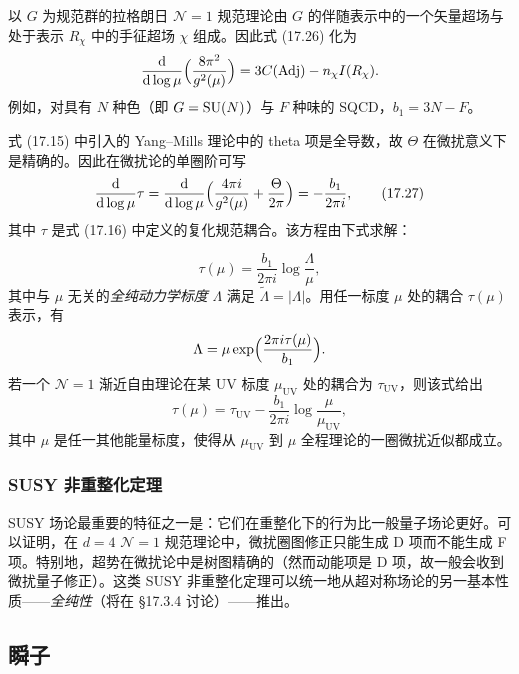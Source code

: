 以 $G$ 为规范群的拉格朗日 $\mathcal{N}=1$ 规范理论由 $G$ 的伴随表示中的一个矢量超场与处于表示 $R_\chi$ 中的手征超场 $\chi$ 组成。因此式 (17.26) 化为
\[
\frac{\mathrm{d}}{\mathrm{d}\log\mu}\Bigl(\frac{8\pi^2}{g^2(\mu)}\Bigr)=3C(\mathrm{Adj})-n_\chi I(R_\chi).
\]
例如，对具有 $N$ 种色（即 $G=\operatorname{SU}(N)$）与 $F$ 种味的 SQCD，$b_1=3N-F$。


式 (17.15) 中引入的 Yang--Mills 理论中的 theta 项是全导数，故 $\Theta$ 在微扰意义下是精确的。因此在微扰论的单圈阶可写
\begin{equation}
\frac{\mathrm{d}}{\mathrm{d}\log\mu}\tau=\frac{\mathrm{d}}{\mathrm{d}\log\mu}\Bigl(\frac{4\pi i}{g^2(\mu)}+\frac{\Theta}{2\pi}\Bigr)=-\frac{b_1}{2\pi i},
\tag{17.27}
\end{equation}
其中 $\tau$ 是式 (17.16) 中定义的复化规范耦合。该方程由下式求解：

\begin{equation}
\tau(\mu)=\frac{b_1}{2\pi i}\log\frac{\Lambda}{\mu},
\tag{17.28}
\end{equation}
其中与 $\mu$ 无关的\emph{全纯动力学标度} $\Lambda$ 满足 $\tilde\Lambda=|\Lambda|$。用任一标度 $\mu$ 处的耦合 $\tau(\mu)$ 表示，有
\[
\Lambda=\mu\exp\Bigl(\frac{2\pi i\tau(\mu)}{b_1}\Bigr).
\]
若一个 $\mathcal{N}=1$ 渐近自由理论在某 UV 标度 $\mu_{\mathrm{UV}}$ 处的耦合为 $\tau_{\mathrm{UV}}$，则该式给出
\[
\tau(\mu)=\tau_{\mathrm{UV}}-\frac{b_1}{2\pi i}\log\frac{\mu}{\mu_{\mathrm{UV}}},
\]
其中 $\mu$ 是任一其他能量标度，使得从 $\mu_{\mathrm{UV}}$ 到 $\mu$ 全程理论的一圈微扰近似都成立。

\subsubsection*{SUSY 非重整化定理}

SUSY 场论最重要的特征之一是：它们在重整化下的行为比一般量子场论更好。可以证明，在 $d=4$ $\mathcal{N}=1$ 规范理论中，微扰圈图修正只能生成 D 项而不能生成 F 项。特别地，超势在微扰论中是树图精确的（然而动能项是 D 项，故一般会收到微扰量子修正）。这类 SUSY 非重整化定理可以统一地从超对称场论的另一基本性质——\emph{全纯性}（将在 §17.3.4 讨论）——推出。

\subsection{瞬子}

